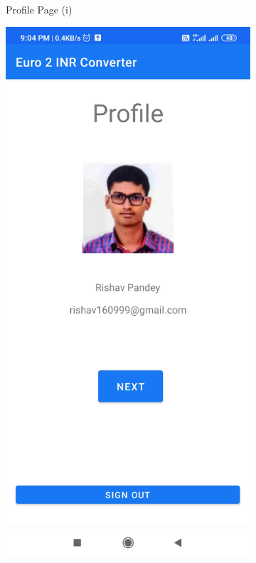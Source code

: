 \documentclass[12pt]{article}
\begin{document}
\begin{figure}[h]
\begin{subfigure}[h]{0.3\textwidth}
\caption{Profile Page (i)}
\label{Profile Page (i)}
\end{subfigure}
\hfill
\begin{subfigure}[h]{0.3\textwidth}
\centering
\includegraphics[scale=0.065]{146977809-c472db56-a7f6-495c-bf03-fbeea30632ab.jpg}

\end{subfigure}
\end{figure}
\end{document}
